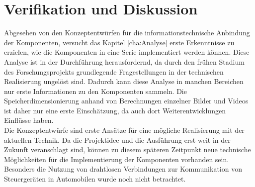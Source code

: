 \chapter{Verifikation und Diskussion}
\label{cha:Verifikation}
Abgesehen von den Konzeptentwürfen für die informationstechnische Anbindung der Komponenten, versucht das Kapitel \ref{cha:Analyse} erste Erkenntnisse zu erzielen, wie die Komponenten in eine Serie implementiert werden können. Diese Analyse ist in der Durchführung herausfordernd, da durch den frühen Stadium des Forschungsprojekts grundlegende Fragestellungen in der technischen Realisierung ungelöst sind. Dadurch kann diese Analyse in manchen Bereichen nur erste Informationen zu den Komponenten sammeln. Die Speicherdimensionierung anhand von Berechnungen einzelner Bilder und Videos ist daher nur eine erste Einschätzung, da auch dort Weiterentwicklungen Einflüsse haben.\\
Die Konzeptentwürfe sind erste Ansätze für eine mögliche Realisierung mit der aktuellen Technik. Da die Projektidee und die Ausführung erst weit in der Zukunft veranschlagt sind, können zu diesem späteren Zeitpunkt neue technische Möglichkeiten für die Implementierung der Komponenten vorhanden sein. Besonders die Nutzung von drahtlosen Verbindungen zur Kommunikation von Steuergeräten in Automobilen wurde noch nicht betrachtet. 
